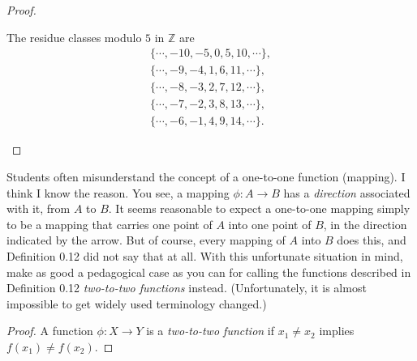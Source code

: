 \begin{proof}
\begin{enumerate}
              The residue classes modulo $5$ in $\mathbb{Z}$ are
              \[
                  \begin{split}
                      \{ \cdots, -10, -5, 0, 5, 10, \cdots \}, \\
                      \{ \cdots, -9, -4, 1, 6, 11, \cdots \}, \\
                      \{ \cdots, -8, -3, 2, 7, 12, \cdots \}, \\
                      \{ \cdots, -7, -2, 3, 8, 13, \cdots \}, \\
                      \{ \cdots, -6, -1, 4, 9, 14, \cdots \}.
                  \end{split}
              \]
    \end{enumerate}
\end{proof}

\begin{exercise}
    Students often misunderstand the concept of a one-to-one function (mapping). I think I know the reason. You see, a mapping $\phi: A \to B$ has a \textit{direction} associated with it, from $A$ to $B$. It seems reasonable to expect a one-to-one mapping simply to be a mapping that carries one point of $A$ into one point of $B$, in the direction indicated by the arrow. But of course, every mapping of $A$ into $B$ does this, and Definition 0.12 did not say that at all. With this unfortunate situation in mind, make as good a pedagogical case as you can for calling the functions described in Definition 0.12 \textit{two-to-two functions} instead. (Unfortunately, it is almost impossible to get widely used terminology changed.)
\end{exercise}

\begin{proof}
    A function $\phi: X\to Y$ is a \textit{two-to-two function} if $x_{1}\ne x_{2}$ implies $f(x_{1})\ne f(x_{2})$.
\end{proof}
